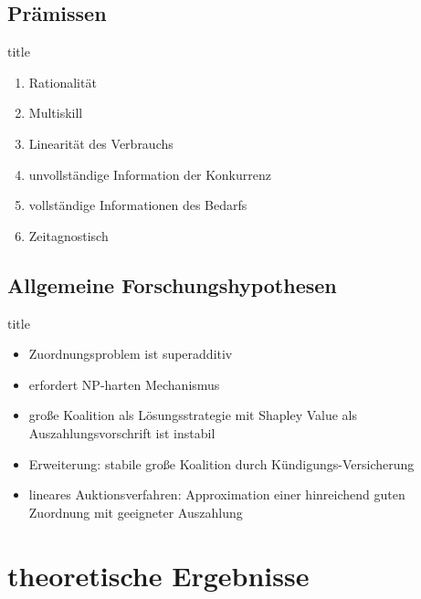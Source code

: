 \documentclass[c]{beamer}
\theoremstyle{break}
\begin{document}
  \subsection*{Prämissen}
  \begin{frame}{title} %
    \begin{enumerate}
      \item Rationalität
      \item Multiskill
      \item Linearität des Verbrauchs
      \item unvollständige Information der Konkurrenz
      \item vollständige Informationen des Bedarfs
      \item Zeitagnostisch
    \end{enumerate}
  \end{frame}


  \subsection*{Allgemeine Forschungshypothesen}
  \begin{frame}{title} %
    \begin{itemize}
      \item Zuordnungsproblem ist superadditiv
      \item erfordert NP-harten Mechanismus
      \item große Koalition als Lösungsstrategie mit Shapley Value als  Auszahlungsvorschrift ist instabil
      \item Erweiterung: stabile große Koalition durch Kündigungs-Versicherung
      \item lineares Auktionsverfahren: Approximation einer hinreichend guten Zuordnung mit geeigneter Auszahlung
    \end{itemize}
  \end{frame}

  \section*{theoretische Ergebnisse}
\end{document}
